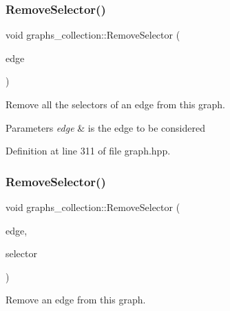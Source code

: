 \subsubsection{\texorpdfstring{Remove\+Selector()}{RemoveSelector()}\hspace{0.1cm}{\footnotesize\ttfamily [1/3]}}
{\footnotesize\ttfamily void graphs\+\_\+collection\+::\+Remove\+Selector (\begin{DoxyParamCaption}\item[{boost\+::graph\+\_\+traits$<$ \hyperlink{structgraphs__collection}{graphs\+\_\+collection} $>$\+::edge\+\_\+descriptor}]{edge }\end{DoxyParamCaption})\hspace{0.3cm}{\ttfamily [inline]}}



Remove all the selectors of an edge from this graph. 


\begin{DoxyParams}{Parameters}
{\em edge} & is the edge to be considered \\
\hline
\end{DoxyParams}


Definition at line 311 of file graph.\+hpp.

\mbox{\label{structgraphs__collection_a615e587a41e5ae7c5638c0adb5f53e47}} 
\subsubsection{\texorpdfstring{Remove\+Selector()}{RemoveSelector()}\hspace{0.1cm}{\footnotesize\ttfamily [2/3]}}
{\footnotesize\ttfamily void graphs\+\_\+collection\+::\+Remove\+Selector (\begin{DoxyParamCaption}\item[{boost\+::graph\+\_\+traits$<$ \hyperlink{structgraphs__collection}{graphs\+\_\+collection} $>$\+::edge\+\_\+descriptor}]{edge,  }\item[{const int}]{selector }\end{DoxyParamCaption})\hspace{0.3cm}{\ttfamily [inline]}}



Remove an edge from this graph. 



